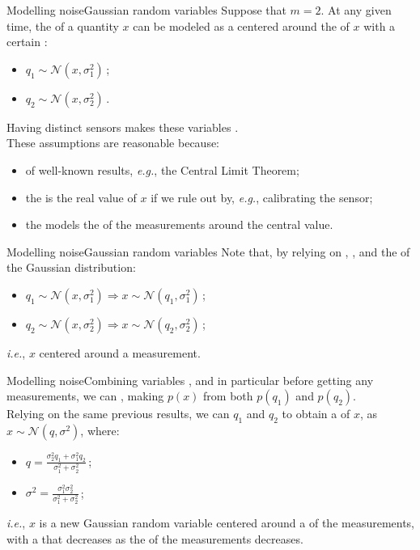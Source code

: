 \begin{frame}{Modelling noise}{Gaussian random variables}
  Suppose that $m=2$. At any given time, the  of a quantity $x$ can be modeled as a  centered around the  of $x$ with a certain :
  \begin{itemize}
    \item $q_1 \sim \mathcal{N}(x,\sigma_1^2)\,$;
    \item $q_2 \sim \mathcal{N}(x,\sigma_2^2)\,$.
  \end{itemize}
  Having distinct sensors makes these variables .\\
  These assumptions are reasonable because:
  \begin{itemize}
    \item of well-known results, \emph{e.g.}, the Central Limit Theorem;
    \item the  is the real value of $x$ if we rule out  by, \emph{e.g.}, calibrating the sensor;
    \item the  models the  of the measurements around the central value.
  \end{itemize}
\end{frame}
\begin{frame}{Modelling noise}{Gaussian random variables}
  Note that, by relying on , , and the  of the Gaussian distribution:
  \begin{itemize}
    \item $q_1 \sim \mathcal{N}(x,\sigma_1^2) \Rightarrow x \sim \mathcal{N}(q_1,\sigma_1^2)\,$;
    \item $q_2 \sim \mathcal{N}(x,\sigma_2^2) \Rightarrow x \sim \mathcal{N}(q_2,\sigma_2^2)\,$;
  \end{itemize}
  \emph{i.e.}, $x$  centered around a measurement.
\end{frame}
\begin{frame}{Modelling noise}{Combining variables}
  , and in particular before getting any measurements, we can , making $p(x)$  from both $p(q_1)$ and $p(q_2)$.\\
  \bigskip
  Relying on the same previous results, we can  $q_1$ and $q_2$ to obtain a  of $x$, as $x \sim \mathcal{N}(q,\sigma^2)$, where:
  \begin{itemize}
    \item $q = \frac{\sigma_2^2 q_1 + \sigma_1^2 q_2}{\sigma_1^2 + \sigma_2^2}\,$;
    \item $\sigma^2 = \frac{\sigma_1^2 \sigma_2^2}{\sigma_1^2 + \sigma_2^2}\,$;
  \end{itemize}
  \emph{i.e.}, $x$ is a new Gaussian random variable centered around a  of the measurements, with a  that decreases as the  of the measurements decreases.
\end{frame}
